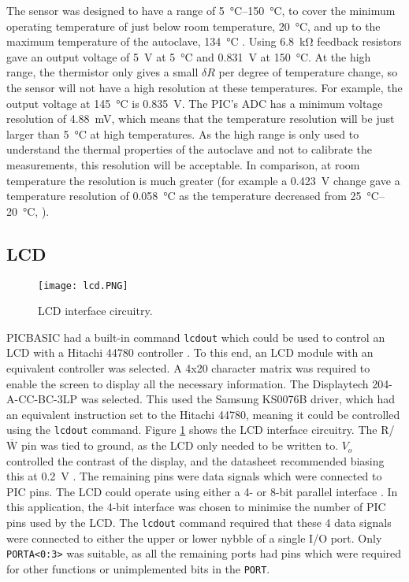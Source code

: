 The sensor was designed to have a range of \SIrange{5}{150}{\celsius}, to cover the minimum operating temperature of just below room temperature, \SI{20}{\celsius}, and up to the maximum temperature of the autoclave, \SI{134}{\celsius} \cite{nhs_autoclave}. Using \SI{6.8}{\kilo\ohm} feedback resistors gave an output voltage of \SI{5}{\volt} at \SI{5}{\celsius} and \SI{0.831}{\volt} at \SI{150}{\celsius}. At the high range, the thermistor only gives a small $\delta R$ per degree of temperature change, so the sensor will not have a high resolution at these temperatures. For example, the output voltage at \SI{145}{\celsius} is \SI{0.835}{\volt}. The PIC's ADC has a minimum voltage resolution of \SI{4.88}{\milli\volt}, which means that the temperature resolution will be just larger than \SI{5}{\celsius} at high temperatures. As the high range is only used to understand the thermal properties of the autoclave and not to calibrate the measurements, this resolution will be acceptable. In comparison, at room temperature the resolution is much greater (for example a \SI{0.423}{\volt} change gave a temperature resolution of \SI{0.058}{\celsius} as the temperature decreased from \SIrange{25}{20}{\celsius}, ).





\subsection{LCD}
\begin{figure}[htb]
	\centering
	\texttt{[image: lcd.PNG]}
	\caption{LCD interface circuitry.}
	\label{fig: lcd schematic}
\end{figure}

PICBASIC had a built-in command \verb|lcdout| which could be used to control an LCD with a Hitachi 44780 controller \cite{picbasic_pro}. To this end, an LCD module with an equivalent controller was selected. A 4x20 character matrix was required to enable the screen to display all the necessary information. The Displaytech 204-A-CC-BC-3LP \cite{lcd} was selected. This used the Samsung KS0076B driver, which had an equivalent instruction set to the Hitachi 44780, meaning it could be controlled using the \verb|lcdout| command. Figure \ref{fig: lcd schematic} shows the LCD interface circuitry. The R/$\overline{\text{W}}$ pin was tied to ground, as the LCD only needed to be written to. $V_o$ controlled the contrast of the display, and the datasheet recommended biasing this at \SI{0.2}{\volt} \cite{lcd}. The remaining pins were data signals which were connected to PIC pins. The LCD could operate using either a 4- or 8-bit parallel interface \cite{picbasic_pro}. In this application, the 4-bit interface was chosen to minimise the number of PIC pins used by the LCD. The \verb|lcdout| command required that these 4 data signals were connected to either the upper or lower nybble of a single I/O port. Only \verb|PORTA<0:3>| was suitable, as all the remaining ports had pins which were required for other functions or unimplemented bits in the \verb|PORT|.\\

